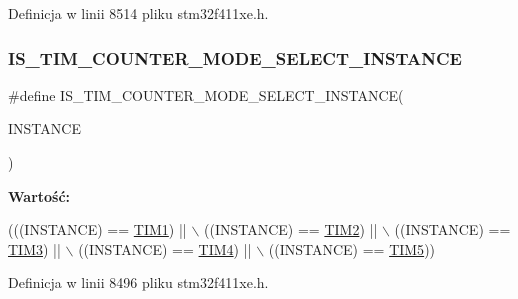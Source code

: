 Definicja w linii 8514 pliku stm32f411xe.\+h.

\mbox{\label{group___exported__macros_gaac0e3e7e7a18fd8eb81734b2baf9e3be}} 
\subsubsection{\texorpdfstring{I\+S\+\_\+\+T\+I\+M\+\_\+\+C\+O\+U\+N\+T\+E\+R\+\_\+\+M\+O\+D\+E\+\_\+\+S\+E\+L\+E\+C\+T\+\_\+\+I\+N\+S\+T\+A\+N\+CE}{IS\_TIM\_COUNTER\_MODE\_SELECT\_INSTANCE}}
{\footnotesize\ttfamily \#define I\+S\+\_\+\+T\+I\+M\+\_\+\+C\+O\+U\+N\+T\+E\+R\+\_\+\+M\+O\+D\+E\+\_\+\+S\+E\+L\+E\+C\+T\+\_\+\+I\+N\+S\+T\+A\+N\+CE(\begin{DoxyParamCaption}\item[{}]{I\+N\+S\+T\+A\+N\+CE }\end{DoxyParamCaption})}

{\bfseries Wartość\+:}
\begin{DoxyCode}
(((INSTANCE) == \hyperlink{group___peripheral__declaration_ga2e87451fea8dc9380056d3cfc5ed81fb}{TIM1}) || \(\backslash\)
                                                        ((INSTANCE) == \hyperlink{group___peripheral__declaration_ga3cfac9f2e43673f790f8668d48b4b92b}{TIM2}) || \(\backslash\)
                                                        ((INSTANCE) == \hyperlink{group___peripheral__declaration_ga61ee4c391385607d7af432b63905fcc9}{TIM3}) || \(\backslash\)
                                                        ((INSTANCE) == \hyperlink{group___peripheral__declaration_ga91a09bad8bdc7a1cb3d85cf49c94c8ec}{TIM4}) || \(\backslash\)
                                                        ((INSTANCE) == \hyperlink{group___peripheral__declaration_ga5125ff6a23a2ed66e2e19bd196128c14}{TIM5}))
\end{DoxyCode}


Definicja w linii 8496 pliku stm32f411xe.\+h.

